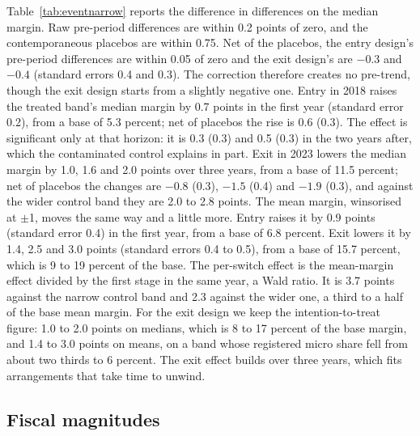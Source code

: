 \documentclass[12pt]{article}
\begin{document}
Table~\ref{tab:eventnarrow} reports the difference in differences on the median margin. Raw pre-period differences are within 0.2 points of zero, and the contemporaneous placebos are within 0.75. Net of the placebos, the entry design's pre-period differences are within 0.05 of zero and the exit design's are $-0.3$ and $-0.4$ (standard errors 0.4 and 0.3). The correction therefore creates no pre-trend, though the exit design starts from a slightly negative one. Entry in 2018 raises the treated band's median margin by 0.7 points in the first year (standard error 0.2), from a base of 5.3 percent; net of placebos the rise is 0.6 (0.3). The effect is significant only at that horizon: it is 0.3 (0.3) and 0.5 (0.3) in the two years after, which the contaminated control explains in part. Exit in 2023 lowers the median margin by 1.0, 1.6 and 2.0 points over three years, from a base of 11.5 percent; net of placebos the changes are $-0.8$ (0.3), $-1.5$ (0.4) and $-1.9$ (0.3), and against the wider control band they are 2.0 to 2.8 points. The mean margin, winsorised at $\pm$1, moves the same way and a little more. Entry raises it by 0.9 points (standard error 0.4) in the first year, from a base of 6.8 percent. Exit lowers it by 1.4, 2.5 and 3.0 points (standard errors 0.4 to 0.5), from a base of 15.7 percent, which is 9 to 19 percent of the base. The per-switch effect is the mean-margin effect divided by the first stage in the same year, a Wald ratio. It is 3.7 points against the narrow control band and 2.3 against the wider one, a third to a half of the base mean margin. For the exit design we keep the intention-to-treat figure: 1.0 to 2.0 points on medians, which is 8 to 17 percent of the base margin, and 1.4 to 3.0 points on means, on a band whose registered micro share fell from about two thirds to 6 percent. The exit effect builds over three years, which fits arrangements that take time to unwind.



\subsection{Fiscal magnitudes}
\end{document}

